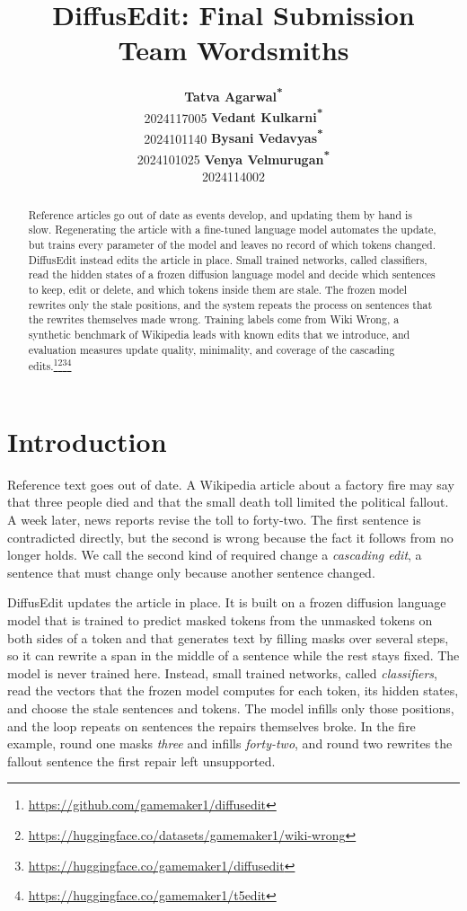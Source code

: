 \documentclass[11pt]{article}
\title{DiffusEdit: Final Submission \\ Team Wordsmiths}
\author{
  \textbf{Tatva Agarwal\textsuperscript{*}} \\ 2024117005 \And
  \textbf{Vedant Kulkarni\textsuperscript{*\dag}} \\ 2024101140 \And
  \textbf{Bysani Vedavyas\textsuperscript{*}} \\ 2024101025 \And
  \textbf{Venya Velmurugan\textsuperscript{*}} \\ 2024114002
}
\begin{document}
\maketitle

\renewcommand{\thefootnote}{\fnsymbol{footnote}}
\renewcommand{\thefootnote}{\arabic{footnote}}
\setcounter{footnote}{0}

\begin{abstract}
Reference articles go out of date as events develop, and updating them by hand is slow. Regenerating the article with a fine-tuned language model automates the update, but trains every parameter of the model and leaves no record of which tokens changed. DiffusEdit instead edits the article in place. Small trained networks, called classifiers, read the hidden states of a frozen diffusion language model and decide which sentences to keep, edit or delete, and which tokens inside them are stale. The frozen model rewrites only the stale positions, and the system repeats the process on sentences that the rewrites themselves made wrong. Training labels come from Wiki Wrong, a synthetic benchmark of Wikipedia leads with known edits that we introduce, and evaluation measures update quality, minimality, and coverage of the cascading edits.\footnote{\scriptsize\url{https://github.com/gamemaker1/diffusedit}}\footnote{\scriptsize\url{https://huggingface.co/datasets/gamemaker1/wiki-wrong}}\footnote{\scriptsize\url{https://huggingface.co/gamemaker1/diffusedit}}\footnote{\scriptsize\url{https://huggingface.co/gamemaker1/t5edit}}
\end{abstract}

\section{Introduction}
Reference text goes out of date. A Wikipedia article about a factory fire may say that three people died and that the small death toll limited the political fallout. A week later, news reports revise the toll to forty-two. The first sentence is contradicted directly, but the second is wrong because the fact it follows from no longer holds. We call the second kind of required change a \emph{cascading edit}, a sentence that must change only because another sentence changed.

DiffusEdit updates the article in place. It is built on a frozen diffusion language model that is trained to predict masked tokens from the unmasked tokens on both sides of a token and that generates text by filling masks over several steps, so it can rewrite a span in the middle of a sentence while the rest stays fixed. The model is never trained here. Instead, small trained networks, called \emph{classifiers}, read the vectors that the frozen model computes for each token, its hidden states, and choose the stale sentences and tokens. The model infills only those positions, and the loop repeats on sentences the repairs themselves broke. In the fire example, round one masks \emph{three} and infills \emph{forty-two}, and round two rewrites the fallout sentence the first repair left unsupported.
    
\end{document}
